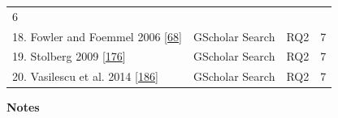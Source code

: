 \documentclass[]{book}
\begin{document}
\begin{longtable}[]{@{}llll@{}}
\begin{minipage}[t]{0.06\columnwidth}
6\strut
\end{minipage}\tabularnewline
\begin{minipage}[t]{0.48\columnwidth}\raggedright\strut
18. Fowler and Foemmel 2006
{[}\protect\hyperlink{ref-fowler2006continuous}{68}{]}\strut
\end{minipage} & \begin{minipage}[t]{0.20\columnwidth}\raggedright\strut
GScholar Search\strut
\end{minipage} & \begin{minipage}[t]{0.14\columnwidth}\raggedright\strut
RQ2\strut
\end{minipage} & \begin{minipage}[t]{0.06\columnwidth}\raggedright\strut
7\strut
\end{minipage}\tabularnewline
\begin{minipage}[t]{0.48\columnwidth}\raggedright\strut
19. Stolberg 2009
{[}\protect\hyperlink{ref-stolberg2009enabling}{176}{]}\strut
\end{minipage} & \begin{minipage}[t]{0.20\columnwidth}\raggedright\strut
GScholar Search\strut
\end{minipage} & \begin{minipage}[t]{0.14\columnwidth}\raggedright\strut
RQ2\strut
\end{minipage} & \begin{minipage}[t]{0.06\columnwidth}\raggedright\strut
7\strut
\end{minipage}\tabularnewline
\begin{minipage}[t]{0.48\columnwidth}\raggedright\strut
20. Vasilescu et al. 2014
{[}\protect\hyperlink{ref-vasilescu2014continuous}{186}{]}\strut
\end{minipage} & \begin{minipage}[t]{0.20\columnwidth}\raggedright\strut
GScholar Search\strut
\end{minipage} & \begin{minipage}[t]{0.14\columnwidth}\raggedright\strut
RQ2\strut
\end{minipage} & \begin{minipage}[t]{0.06\columnwidth}\raggedright\strut
7\strut
\end{minipage}\tabularnewline
\bottomrule
\end{longtable}

\textbf{Notes}
\end{document}
